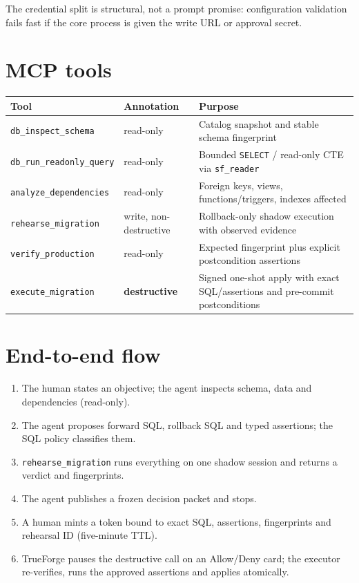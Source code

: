 \documentclass[10pt,a4paper]{article}
\begin{document}
The credential split is structural, not a prompt promise: configuration validation fails fast if the
core process is given the write URL or approval secret.

\section*{MCP tools}
\begin{tabularx}{\linewidth}{@{}llX@{}}
\toprule
\textbf{Tool} & \textbf{Annotation} & \textbf{Purpose} \\
\midrule
\texttt{db\_inspect\_schema}      & read-only   & Catalog snapshot and stable schema fingerprint \\
\texttt{db\_run\_readonly\_query} & read-only   & Bounded \texttt{SELECT} / read-only CTE via \texttt{sf\_reader} \\
\texttt{analyze\_dependencies}    & read-only   & Foreign keys, views, functions/triggers, indexes affected \\
\texttt{rehearse\_migration}      & write, non-destructive & Rollback-only shadow execution with observed evidence \\
\texttt{verify\_production}       & read-only   & Expected fingerprint plus explicit postcondition assertions \\
\texttt{execute\_migration}       & \textbf{destructive} & Signed one-shot apply with exact SQL/assertions and pre-commit postconditions \\
\bottomrule
\end{tabularx}

\section*{End-to-end flow}
\begin{enumerate}
  \item The human states an objective; the agent inspects schema, data and dependencies (read-only).
  \item The agent proposes forward SQL, rollback SQL and typed assertions; the SQL policy classifies them.
  \item \texttt{rehearse\_migration} runs everything on one shadow session and returns a verdict and fingerprints.
  \item The agent publishes a frozen decision packet and stops.
  \item A human mints a token bound to exact SQL, assertions, fingerprints and rehearsal ID (five-minute TTL).
  \item TrueForge pauses the destructive call on an Allow/Deny card; the executor re-verifies, runs the approved assertions and applies atomically.
\end{enumerate}
\end{document}
